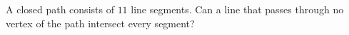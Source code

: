 A closed path consists of $11$ line segments. Can a line that passes through no vertex of the path intersect every segment?
